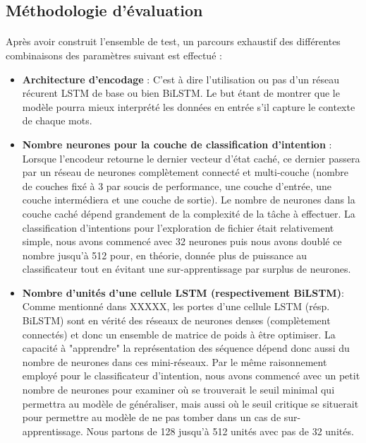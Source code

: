 	\subsection{Méthodologie d'évaluation}
	\label{nlu_steps}
	\paragraph{}
	Après avoir construit l'ensemble de test, un parcours exhaustif des différentes combinaisons des paramètres suivant est effectué : 
	\begin{itemize}
		\item \textbf{Architecture d'encodage} :
		C'est à dire l'utilisation ou pas d'un réseau récurent LSTM de base ou bien BiLSTM. Le but étant de montrer que le modèle pourra mieux interprété les données en entrée s'il capture le contexte de chaque mots.
		
		\item \textbf{Nombre neurones pour la couche de classification d'intention } : Lorsque l'encodeur retourne le dernier vecteur d'état caché, ce dernier passera par un réseau de neurones complètement connecté et multi-couche (nombre de couches fixé à 3 par soucis de performance, une couche d'entrée, une couche intermédiera et une couche de sortie). Le nombre de neurones dans la couche caché dépend grandement de la complexité de la tâche à effectuer. La classification d'intentions pour l'exploration de fichier était relativement simple, nous avons commencé avec 32 neurones puis nous avons doublé ce nombre jusqu'à 512 pour, en théorie, donnée plus de puissance au classificateur tout en évitant une sur-apprentissage par surplus de neurones.
		
		\item \textbf{Nombre d'unités d'une cellule LSTM (respectivement BiLSTM)}:
		Comme mentionné dans XXXXX, les portes d'une cellule LSTM (résp. BiLSTM) sont en vérité des réseaux de neurones denses (complètement connectés) et donc un ensemble de matrice de poids à être optimiser. La capacité à "apprendre" la représentation des séquence dépend donc aussi du nombre de neurones dans ces mini-réseaux. Par le même raisonnement employé pour le classificateur d'intention, nous avons commencé avec un petit nombre de neurones pour examiner où se trouverait le seuil minimal qui permettra au modèle de généraliser, mais aussi où le seuil critique se situerait pour permettre au modèle de ne pas tomber dans un cas de sur-apprentissage. Nous partons de 128 jusqu'à 512 unités avec pas de 32 unités.
		

\end{itemize}

